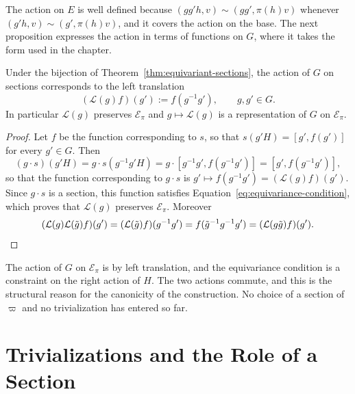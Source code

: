 	The action on $E$ is well defined because $(gg'h,v)\sim(gg',\pi(h)v)$ whenever $(g'h,v)\sim(g',\pi(h)v)$, and it covers the action on the base. The next proposition expresses the action in terms of functions on $G$, where it takes the form used in the chapter.
	
	\begin{proposition}\label{prop:action-equivariant}
		Under the bijection of Theorem~\ref{thm:equivariant-sections}, the action of $G$ on sections corresponds to the left translation
		\begin{equation}\label{eq:left-translation}
			(\mathcal{L}(g)f)(g'):=f(g^{-1}g'),\qquad g,g'\in G.
		\end{equation}
		In particular $\mathcal{L}(g)$ preserves $\mathcal{E}_\pi$ and $g\mapsto\mathcal{L}(g)$ is a representation of $G$ on $\mathcal{E}_\pi$.
	\end{proposition}
	
	\begin{proof}
		Let $f$ be the function corresponding to $s$, so that $s(g'H)=[g',f(g')]$ for every $g'\in G$. Then
		\begin{equation*}
			(g\cdot s)(g'H)=g\cdot s(g^{-1}g'H)=g\cdot[g^{-1}g',f(g^{-1}g')]=[g',f(g^{-1}g')],
		\end{equation*}
		so that the function corresponding to $g\cdot s$ is $g'\mapsto f(g^{-1}g')=(\mathcal{L}(g)f)(g')$. Since $g\cdot s$ is a section, this function satisfies Equation~\eqref{eq:equivariance-condition}, which proves that $\mathcal{L}(g)$ preserves $\mathcal{E}_\pi$. Moreover
		\begin{equation*}
			(\mathcal{L}(g)\mathcal{L}(\tilde{g})f)(g')=(\mathcal{L}(\tilde{g})f)(g^{-1}g')=f(\tilde{g}^{-1}g^{-1}g')=(\mathcal{L}(g\tilde{g})f)(g').\qedhere
		\end{equation*}
	\end{proof}
	
	\begin{remark}\label{rem:left-right-commute}
		The action of $G$ on $\mathcal{E}_\pi$ is by left translation, and the equivariance condition is a constraint on the right action of $H$. The two actions commute, and this is the structural reason for the canonicity of the construction. No choice of a section of $\varpi$ and no trivialization has entered so far.
	\end{remark}
	
	\section{Trivializations and the Role of a Section}
	\label{sec:trivialization}
	
